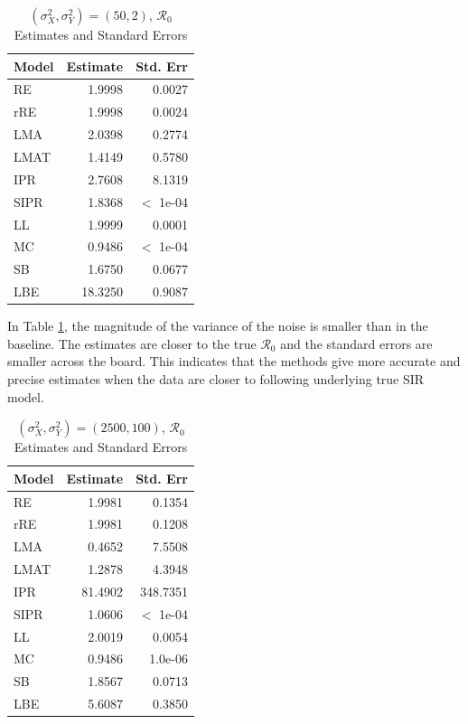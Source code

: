 \documentclass[12pt]{article}
\newcommand{\rr}{\ensuremath{\mathcal{R}_0}}
\begin{document}
\begin{table}[H]
	

	\centering
	\begin{tabular}[t]{l|r|r}
		\hline
		Model & Estimate & Std. Err\\
		\hline
		RE & 1.9998 & 0.0027\\
		\hline
		rRE & 1.9998 & 0.0024\\
		\hline
		LMA & 2.0398 & 0.2774\\
		\hline
		LMAT & 1.4149 & 0.5780\\
		\hline
		IPR & 2.7608 & 8.1319\\
		\hline
		SIPR & 1.8368 & $<$ 1e-04\\
		\hline
		LL & 1.9999 & 0.0001\\
		\hline
		MC & 0.9486 & $<$ 1e-04\\
		\hline
		SB & 1.6750 & 0.0677\\
		\hline
		LBE & 18.3250 & 0.9087\\
		\hline
	\end{tabular}
        	\caption{ $(\sigma^2_X, \sigma^2_Y) = (50, 2)$, $\rr$ Estimates and Standard Errors}\label{tab:mag-var-res1}
\end{table}

In Table \ref{tab:mag-var-res1}, the magnitude of the variance of the noise is smaller than in the baseline. The estimates are closer to the true $\rr$ and the standard errors are smaller across the board. This indicates that the methods give more accurate and precise estimates when the data are closer to following underlying true SIR model.


\begin{table}[H]
	

	\centering
	\begin{tabular}[t]{l|r|r}
		\hline
		Model & Estimate & Std. Err\\
		\hline
		RE & 1.9981 & 0.1354\\
		\hline
		rRE & 1.9981 & 0.1208\\
		\hline
		LMA & 0.4652 & 7.5508\\
		\hline
		LMAT & 1.2878 & 4.3948\\
		\hline
		IPR & 81.4902 & 348.7351\\
		\hline
		SIPR & 1.0606 & $<$ 1e-04\\
		\hline
		LL & 2.0019 & 0.0054\\
		\hline
		MC & 0.9486 & 1.0e-06\\
		\hline
		SB & 1.8567 & 0.0713\\
		\hline
		LBE & 5.6087 & 0.3850\\
		\hline
	\end{tabular}
        	\caption{$(\sigma^2_X, \sigma^2_Y) = (2500, 100)$, $\rr$ Estimates and Standard Errors}\label{tab:mag-var-res2}
\end{table}
\end{document}
